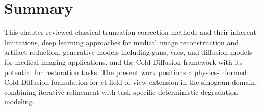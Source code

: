 \section{Summary}

This chapter reviewed classical truncation correction methods and their inherent limitations, deep learning approaches for medical image reconstruction and artifact reduction, generative models including \glspl{gan}, \glspl{vae}, and diffusion models for medical imaging applications, and the Cold Diffusion framework with its potential for restoration tasks. The present work positions a physics-informed Cold Diffusion formulation for \gls{ct} field-of-view extension in the sinogram domain, combining iterative refinement with task-specific deterministic degradation modeling.
